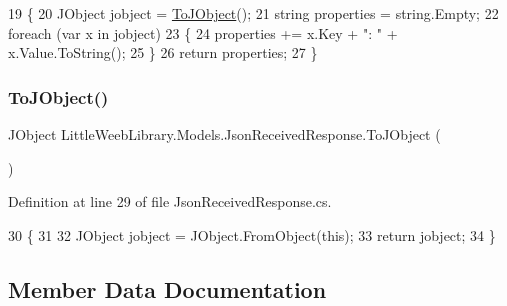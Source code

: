 \begin{DoxyCode}
19         \{
20             JObject jobject = \mbox{\hyperlink{class_little_weeb_library_1_1_models_1_1_json_received_response_a415c10f87514185eebe1d911be1f32d2}{ToJObject}}();
21             \textcolor{keywordtype}{string} properties = \textcolor{keywordtype}{string}.Empty;
22             \textcolor{keywordflow}{foreach} (var x \textcolor{keywordflow}{in} jobject)
23             \{
24                 properties += x.Key + \textcolor{stringliteral}{": "} + x.Value.ToString();
25             \}
26             \textcolor{keywordflow}{return} properties;
27         \}
\end{DoxyCode}
\mbox{\label{class_little_weeb_library_1_1_models_1_1_json_received_response_a415c10f87514185eebe1d911be1f32d2}} 
\subsubsection{\texorpdfstring{To\+J\+Object()}{ToJObject()}}
{\footnotesize\ttfamily J\+Object Little\+Weeb\+Library.\+Models.\+Json\+Received\+Response.\+To\+J\+Object (\begin{DoxyParamCaption}{ }\end{DoxyParamCaption})}



Definition at line 29 of file Json\+Received\+Response.\+cs.


\begin{DoxyCode}
30         \{
31 
32             JObject jobject = JObject.FromObject(\textcolor{keyword}{this});
33             \textcolor{keywordflow}{return} jobject;
34         \}
\end{DoxyCode}


\subsection{Member Data Documentation}
\mbox{\label{class_little_weeb_library_1_1_models_1_1_json_received_response_af28532db4b071f09d3f5c332d98ac470}} 
